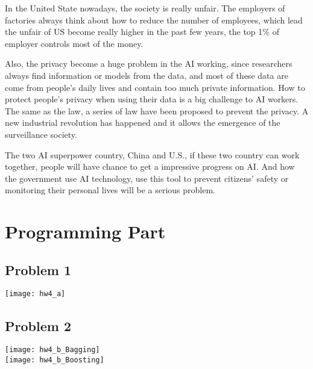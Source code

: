 \documentclass[12pt]{article}
\begin{document}
In the United State nowadays, the society is really unfair. The employers of factories always think about how to reduce the number of employees, which lead the unfair of US become really higher in the past few years, the top 1\% of employer controls most of the money.

Also, the privacy become a huge problem in the AI working, since researchers always find information or models from the data, and most of these data are come from people's daily lives and contain too much private information. How to protect people's privacy when using their data is a big challenge to AI workers. The same as the law, a series of law have been proposed to prevent the privacy. A new industrial revolution has happened and it allows the emergence of the surveillance society.

The two AI superpower country, China and U.S., if these two country can work together, people will have chance to get a impressive progress on AI. And how the government use AI technology, use this tool to prevent citizens' safety or monitoring their personal lives will be a serious problem.
    \section{Programming Part}
        \subsection{Problem 1}
            \texttt{[image: hw4\_a]}\\
        \subsection{Problem 2}
            \texttt{[image: hw4\_b\_Bagging]}\\
            \texttt{[image: hw4\_b\_Boosting]}
\end{document}
